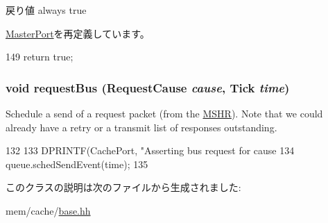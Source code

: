 \begin{DoxyReturn}{戻り値}
always true 
\end{DoxyReturn}


\hyperlink{classMasterPort_a32602a6a3c3d66a639455036d6c08dd6}{MasterPort}を再定義しています。


\begin{DoxyCode}
149 { return true; }
\end{DoxyCode}
\hypertarget{classBaseCache_1_1CacheMasterPort_ab690fedcc60b65a21572adb94bce5525}{
\subsubsection[{requestBus}]{\setlength{\rightskip}{0pt plus 5cm}void requestBus ({\bf RequestCause} {\em cause}, \/  {\bf Tick} {\em time})}}
\label{classBaseCache_1_1CacheMasterPort_ab690fedcc60b65a21572adb94bce5525}
Schedule a send of a request packet (from the \hyperlink{classMSHR}{MSHR}). Note that we could already have a retry or a transmit list of responses outstanding. 


\begin{DoxyCode}
132         {
133             DPRINTF(CachePort, "Asserting bus request for cause %
134             queue.schedSendEvent(time);
135         }
\end{DoxyCode}


このクラスの説明は次のファイルから生成されました:\begin{DoxyCompactItemize}
\item 
mem/cache/\hyperlink{mem_2cache_2base_8hh}{base.hh}\end{DoxyCompactItemize}
